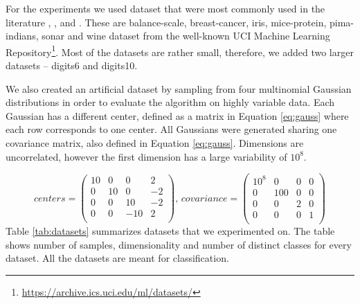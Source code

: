 For the experiments we used dataset that were most commonly used in the literature \cite{xing2002distance}, \cite{weinberger2009distance}, \cite{jacobgoldberger2004neighbourhood} and \cite{fukui2013evolutionary}. These are balance-scale, breast-cancer, iris, mice-protein, pima-indians, sonar and wine dataset from the well-known UCI Machine Learning Repository\footnote{\url{https://archive.ics.uci.edu/ml/datasets/}}. Most of the datasets are rather small, therefore, we added two larger datasets -- digits6 and digits10.

We also created an artificial dataset by sampling from four multinomial Gaussian distributions in order to evaluate the algorithm on highly variable data. Each Gaussian has a different center, defined as a matrix in Equation \eqref{eq:gauss} where each row corresponds to one center. All Gaussians were generated sharing one covariance matrix, also defined in Equation \ref{eq:gauss}. Dimensions are uncorrelated, however the first dimension has a large variability of $10^8$.

\begin{equation} \label{eq:gauss}
centers = \begin{pmatrix}
10 & 0 & 0 & 2 \\
0 & 10 & 0 & -2 \\
0 & 0 & 10 & -2 \\
0 & 0 & -10 & 2 \\
\end{pmatrix}, \,
covariance = \begin{pmatrix}
10^8 & 0 & 0 & 0 \\
0 & 100 & 0 & 0 \\
0 & 0 & 2 & 0 \\
0 & 0 & 0 & 1 \\
\end{pmatrix}
\end{equation}
Table \ref{tab:datasets} summarizes datasets that we experimented on. The table shows number of samples, dimensionality and number of distinct classes for every dataset. All the datasets are meant for classification.

